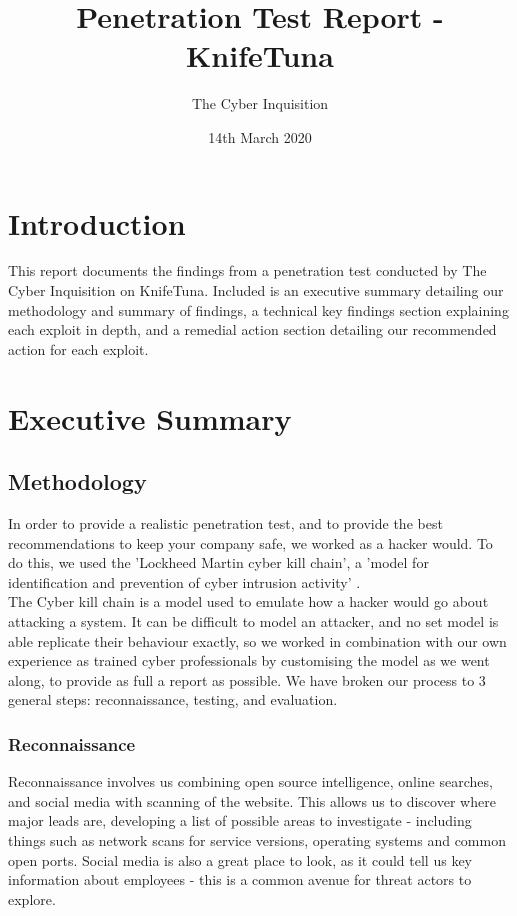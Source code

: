 \documentclass{report}
\title{Penetration Test Report - KnifeTuna}
\author{The Cyber Inquisition}
\date{14th March 2020}
\begin{document}
\maketitle
\tableofcontents
\listoffigures

\chapter{Introduction}
This report documents the findings from a penetration test conducted by The Cyber Inquisition on KnifeTuna. Included is an executive summary detailing our methodology and summary of findings, a technical key findings section explaining each exploit in depth, and a remedial action section detailing our recommended action for each exploit.

\chapter{Executive Summary}
\section{Methodology}
In order to provide a realistic penetration test, and to provide the best recommendations to keep your company safe, we worked as a hacker would. To do this, we used the 'Lockheed Martin cyber kill chain', a 'model for identification and prevention of cyber intrusion activity' \cite{lockheed}.\\ 
The Cyber kill chain is a model used to emulate how a hacker would go about attacking a system. It can be difficult to model an attacker, and no set model is able replicate their behaviour exactly, so we worked in combination with our own experience as trained cyber professionals by customising the model as we went along, to provide as full a report as possible. We have broken our process to 3 general steps: reconnaissance, testing, and evaluation.
\subsection{Reconnaissance}
Reconnaissance involves us combining open source intelligence, online searches, and social media with scanning of the website. This allows us to discover where major leads are, developing a list of possible areas to investigate - including things such as network scans for service versions, operating systems and common open ports. Social media is also a great place to look, as it could tell us key information about employees - this is a common avenue for threat actors to explore.
\end{document}
